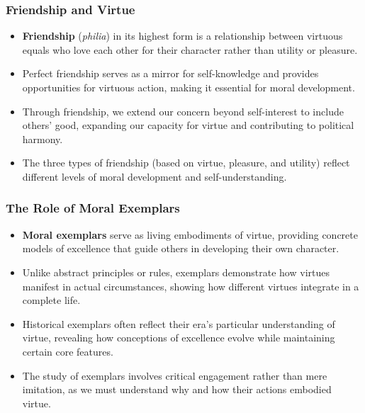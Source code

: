 \documentclass{beamer}
\begin{document}
\begin{frame}
    \frametitle{Friendship and Virtue}
    \begin{itemize}
        \item \textbf{Friendship} (\textit{philia}) in its highest form is a relationship between virtuous equals who love each other for their character rather than utility or pleasure.
        
        \item Perfect friendship serves as a mirror for self-knowledge and provides opportunities for virtuous action, making it essential for moral development.
        
        \item Through friendship, we extend our concern beyond self-interest to include others' good, expanding our capacity for virtue and contributing to political harmony.
        
        \item The three types of friendship (based on virtue, pleasure, and utility) reflect different levels of moral development and self-understanding.
    \end{itemize}
\end{frame}

\begin{frame}
    \frametitle{The Role of Moral Exemplars}
    \begin{itemize}
        \item \textbf{Moral exemplars} serve as living embodiments of virtue, providing concrete models of excellence that guide others in developing their own character.
        
        \item Unlike abstract principles or rules, exemplars demonstrate how virtues manifest in actual circumstances, showing how different virtues integrate in a complete life.
        
        \item Historical exemplars often reflect their era's particular understanding of virtue, revealing how conceptions of excellence evolve while maintaining certain core features.
        
        \item The study of exemplars involves critical engagement rather than mere imitation, as we must understand why and how their actions embodied virtue.
    \end{itemize}
\end{frame}
\end{document}
